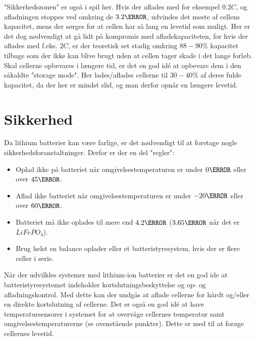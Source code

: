 "Sikkerhedszonen" \space er også i spil her. Hvis der aflades med for eksempel $0.2C$, og afladningen stoppes ved omkring de $3.2\volt$, udvindes det meste af cellens kapacitet, mens der sørges for at cellen har så lang en levetid som muligt. Her er det dog nødvendigt at gå lidt på kompromis med afladekapaciteten, for hvis der aflades med f.eks. $2C$, er der teoretisk set stadig omkring $88-90\percent$ kapacitet tilbage som der ikke kan blive brugt uden at cellen tager skade i det lange forløb. \\

Skal cellerne opbevares i længere tid, er det en god idé at opbevare dem i den såkaldte "storage mode". Her lades/aflades cellerne til $30-40\percent$ af deres fulde kapacitet, da der her er mindst slid, og man derfor opnår en længere levetid. 

\section{Sikkerhed}
Da lithium batterier kan være farlige, er det nødvendigt til at foretage nogle sikkerhedsforanstaltninger. Derfor er der en del "regler":

\begin{itemize}[noitemsep]
\item Oplad ikke på batteriet når omgivelsestemperaturen er under $0\degreeCelsius$ eller over $45\degreeCelsius$. 
\item Aflad ikke batteriet når omgivelsestemperaturen er under $-20\degreeCelsius$ eller over $60\degreeCelsius$.
\item Batteriet må ikke oplades til mere end $4.2\volt$ ($3.65\volt$ når det er $LiFePO_4$).
\item Brug helst en balance oplader eller et batteristyresystem, hvis der er flere celler i serie.
\end{itemize}

Når der udvilkles systemer med lithium-ion batterier er det en god ide at batteristyresystemet indeholder kortslutningsbeskyttelse og op- og afladningskontrol. Med dette kan der undgås at aflade cellerne for hårdt og/eller en direkte kortslutning af cellerne. Det er også en god idé at have temperatursensorer i systemet for at overvåge cellernes temperatur samt omgivelsestemperaturerne (se ovenstående punkter). Dette er med til at forøge cellernes levetid. 

